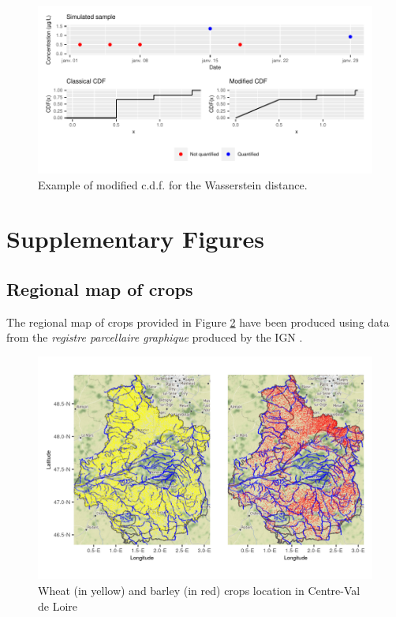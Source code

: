 \begin{appendices}
\begin{figure}[ht]
    \centering
    \includegraphics{figs/App/Wass_ew.pdf}
    \caption{Example of modified c.d.f. for the Wasserstein distance.}
    \label{fig:mod_dist}
\end{figure}

\section{Supplementary Figures}

\subsection{Regional map of crops}\label{section:crops}
The regional map of crops provided in Figure \ref{fig:crops} have been produced using data from the \emph{registre parcellaire graphique} produced by the IGN \cite{IGN:RPG}.

\begin{figure}[ht]
    \centering
    \includegraphics{figs/App/Occ_soil.png}
    \caption{Wheat (in yellow) and barley (in red) crops location in Centre-Val de Loire}
    \label{fig:crops}
\end{figure} 


\end{appendices}
